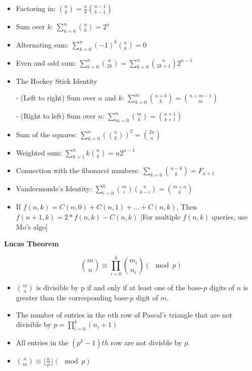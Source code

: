 \begin{itemize}
  \item Factoring in: \( \binom{n}{k} = \frac{n}{k} \binom{n - 1}{k - 1} \)

  \item Sum over \( k \): \( \sum_{k = 0}^n \binom{n}{k} = 2^n \)

  \item Alternating sum: \( \sum_{k = 0}^n (-1)^k \binom{n}{k} = 0 \)

  \item Even and odd sum: \( \sum_{k = 0}^n \binom{n}{2k} = \sum_{k = 0}^n \binom{n}{2k + 1} 2^{n - 1} \)

  \item The Hockey Stick Identity

     - (Left to right) Sum over \( n \) and \( k \): \( \sum_{k = 0}^m \binom{n + k}{k} = \binom{n + m - 1}{m} \)

     - (Right to left) Sum over \( n \): \( \sum_{m = 0}^n \binom{m}{k} = \binom{n + 1}{k + 1} \)

  \item Sum of the squares: \( \sum_{k = 0}^n (\binom{n}{k})^2 = \binom{2n}{n} \)

  \item Weighted sum: \( \sum_{k = 1}^n k \binom{n}{k} = n2^{n - 1} \)

  \item Connection with the fibonacci numbers: \( \sum_{k = 0}\binom{n - k}{k} = F_{n + 1} \)

  \item Vandermonde's Identity: \( \sum_{i = 0}^k \binom{m}{i} \binom{n}{k - i} = \binom{m + n}{k} \)
  \item If \( f(n, k) = C(n, 0) + C(n, 1) + ... + C(n, k) \), Then \( f(n + 1, k) = 2 * f(n, k) - C(n, k) \) [For multiple \( f(n, k) \) queries, use Mo's algo]
\end{itemize}

\textbf{Lucas Theorem}

\[ \binom{m}{n} \equiv \prod_{i = 0}^k \binom{m_i}{n_i} (\mod p) \]

\begin{itemize}
  \item \( \binom{m}{n} \) is divisible by p if and only if at least one of the base-\(p\) digits of \( n \) is greater than the corresponding base-\( p \) digit of \( m \).

  \item The number of entries in the \( n \)th row of Pascal's triangle that are not divisible by \( p  = \prod_{i = 0}^k (n_i + 1) \)

  \item All entries in the \( (p^{k} - 1)th \) row are not divisble by \( p \).
  \item \( \binom{n}{m} \equiv \lfloor \frac{n}{p} \rfloor (\mod p) \)
\end{itemize}

